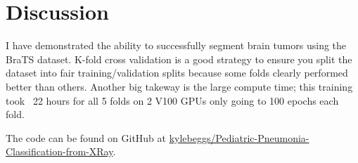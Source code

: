 \documentclass[10pt,twocolumn,letterpaper]{article}
\begin{document}
\section{Discussion}

I have demonstrated the ability to successfully segment brain tumors using the BraTS dataset. K-fold cross validation is a good strategy to ensure you split the dataset into fair training/validation splits because some folds clearly performed better than others. Another big takeway is the large compute time; this training took ~22 hours for all 5 folds on 2 V100 GPUs only going to 100 epochs each fold. 

The code can be found on GitHub at \href{https://github.com/kylebeggs/Pediatric-Pneumonia-Classification-from-XRay}{kylebeggs/Pediatric-Pneumonia-Classification-from-XRay}.

{\small


}
\end{document}
